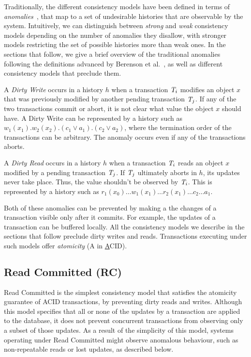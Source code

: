 Traditionally, the different consistency models have been defined in terms of \emph{anomalies}~\citep{sql-critique}, that map to a set of undesirable histories that are observable by the system. Intuitively, we can distinguish between \emph{strong} and \emph{weak} consistency models depending on the number of anomalies they disallow, with stronger models restricting the set of possible histories more than weak ones. In the sections that follow, we give a brief overview of the traditional anomalies following the definitions advanced by Berenson et al.~\citep{sql-critique}, as well as different consistency models that preclude them.

\begin{definition}
A \emph{Dirty Write} occurs in a history $h$ when a transaction $\mathit{T}_i$ modifies an object $x$ that was previously modified by another pending transaction $\mathit{T}_j$. If any of the two transactions commit or abort, it is not clear what value the object $x$ should have. A Dirty Write can be represented by a history such as $w_1(x_1).w_2(x_2).(c_1 \vee a_1).(c_2 \vee a_2)$, where the termination order of the transactions can be arbitrary. The anomaly occurs even if any of the transactions aborts.
\end{definition}

\begin{definition}
A \emph{Dirty Read} occurs in a history $h$ when a transaction $\mathit{T}_i$ reads an object $x$ modified by a pending transaction $\mathit{T}_j$. If $\mathit{T}_j$ ultimately aborts in $h$, its updates never take place. Thus, the value shouldn't be observed by $\mathit{T}_i$. This is represented by a history such as $r_1(x_0)\ldots w_1(x_1)\ldots r_2(x_1)\ldots c_2\ldots a_1$.
\end{definition}

Both of these anomalies can be prevented by making a the changes of a transaction visible only after it commits. For example, the updates of a transaction can be buffered locally. All the consistency models we describe in the sections that follow preclude dirty writes and reads. Transactions executing under such models offer \emph{atomicity} (A in \underline{A}CID).

\subsection{Read Committed (RC)}

Read Committed is the simplest consistency model that satisfies the atomicity guarantee of ACID transactions, by preventing dirty reads and writes. Although this model specifies that all or none of the updates by a transaction are applied to the database, it does not prevent concurrent transactions from observing only a subset of those updates. As a result of the simplicity of this model, systems operating under Read Committed might observe anomalous behaviour, such as non-repeatable reads or lost updates, as described below.

